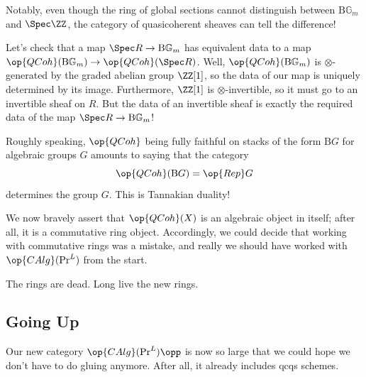 \documentclass[../notes.tex]{subfiles}
\begin{document}
Notably, even though the ring of global sections cannot distinguish between $\mathrm B\mathbb G_m$ and $\Spec\ZZ$, the category of quasicoherent sheaves can tell the difference!
\begin{remark}
	Let's check that a map $\Spec R\to\mathrm B\mathbb G_m$ has equivalent data to a map $\op{QCoh}(\mathrm B\mathbb G_m)\to\op{QCoh}(\Spec R)$. Well, $\op{QCoh}(\mathrm B\mathbb G_m)$ is $\otimes$-generated by the graded abelian group $\ZZ[1]$, so the data of our map is uniquely determined by its image. Furthermore, $\ZZ[1]$ is $\otimes$-invertible, so it must go to an invertible sheaf on $R$. But the data of an invertible sheaf is exactly the required data of the map $\Spec R\to\mathrm B\mathbb G_m$!
\end{remark}
\begin{remark}
	Roughly speaking, $\op{QCoh}$ being fully faithful on stacks of the form $\mathrm BG$ for algebraic groups $G$ amounts to saying that the category
	\[\op{QCoh}(\mathrm BG)=\op{Rep}G\]
	determines the group $G$. This is Tannakian duality!
\end{remark}
We now bravely assert that $\op{QCoh}(X)$ is an algebraic object in itself; after all, it is a commutative ring object. Accordingly, we could decide that working with commutative rings was a mistake, and really we should have worked with $\op{CAlg}(\mathrm{Pr}^L)$ from the start.
\begin{remark}[Schlank]
	The rings are dead. Long live the new rings.
\end{remark}

\subsection{Going Up}
Our new category $\op{CAlg}(\mathrm{Pr}^L)\opp$ is now so large that we could hope we don't have to do gluing anymore. After all, it already includes qcqs schemes.
\end{document}
